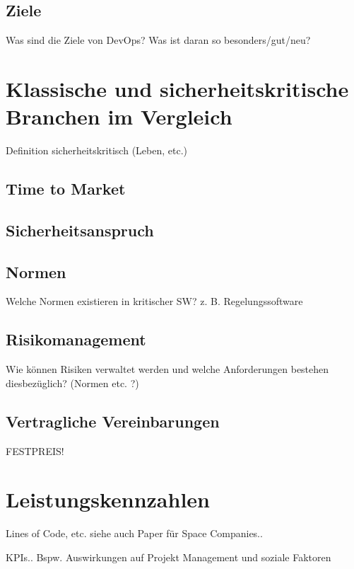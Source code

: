 \subsection{Ziele}
Was sind die Ziele von DevOps? Was ist daran so besonders/gut/neu?

\section{Klassische und sicherheitskritische Branchen im Vergleich} %

Definition sicherheitskritisch (Leben, etc.)

\subsection{Time to Market}

\subsection{Sicherheitsanspruch}

\subsection{Normen}

Welche Normen existieren in kritischer SW? z. B. Regelungssoftware

\subsection{Risikomanagement}

Wie können Risiken verwaltet werden und welche Anforderungen bestehen diesbezüglich? (Normen etc. ?)

\subsection{Vertragliche Vereinbarungen}

FESTPREIS!

\section{Leistungskennzahlen} %

Lines of Code, etc.
siehe auch Paper für Space Companies..

KPIs..
Bspw. Auswirkungen auf Projekt Management und soziale Faktoren
